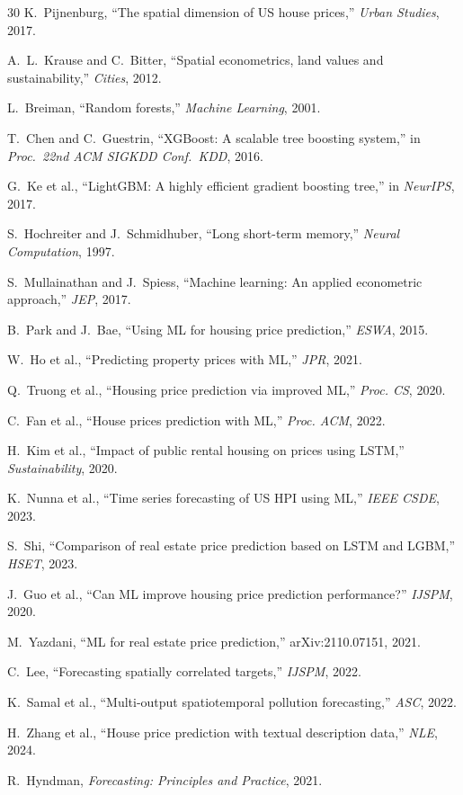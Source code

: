 \documentclass[runningheads]{llncs}
\begin{document}
\begin{thebibliography}{30}
K.~Pijnenburg,
``The spatial dimension of US house prices,''
\emph{Urban Studies}, 2017.

A.~L.~Krause and C.~Bitter,
``Spatial econometrics, land values and sustainability,''
\emph{Cities}, 2012.

L.~Breiman,
``Random forests,''
\emph{Machine Learning}, 2001.

T.~Chen and C.~Guestrin,
``XGBoost: A scalable tree boosting system,''
in \emph{Proc.\ 22nd ACM SIGKDD Conf.\ KDD}, 2016.

G.~Ke et al.,
``LightGBM: A highly efficient gradient boosting tree,''
in \emph{NeurIPS}, 2017.

S.~Hochreiter and J.~Schmidhuber,
``Long short-term memory,''
\emph{Neural Computation}, 1997.

S.~Mullainathan and J.~Spiess,
``Machine learning: An applied econometric approach,''
\emph{JEP}, 2017.

B.~Park and J.~Bae,
``Using ML for housing price prediction,''
\emph{ESWA}, 2015.

W.~Ho et al.,
``Predicting property prices with ML,''
\emph{JPR}, 2021.

Q.~Truong et al.,
``Housing price prediction via improved ML,''
\emph{Proc. CS}, 2020.

C.~Fan et al.,
``House prices prediction with ML,''
\emph{Proc. ACM}, 2022.

H.~Kim et al.,
``Impact of public rental housing on prices using LSTM,''
\emph{Sustainability}, 2020.

K.~Nunna et al.,
``Time series forecasting of US HPI using ML,''
\emph{IEEE CSDE}, 2023.

S.~Shi,
``Comparison of real estate price prediction based on LSTM and LGBM,''
\emph{HSET}, 2023.

J.~Guo et al.,
``Can ML improve housing price prediction performance?''
\emph{IJSPM}, 2020.

M.~Yazdani,
``ML for real estate price prediction,''
arXiv:2110.07151, 2021.

C.~Lee,
``Forecasting spatially correlated targets,''
\emph{IJSPM}, 2022.

K.~Samal et al.,
``Multi-output spatiotemporal pollution forecasting,''
\emph{ASC}, 2022.

H.~Zhang et al.,
``House price prediction with textual description data,''
\emph{NLE}, 2024.

R.~Hyndman,
\emph{Forecasting: Principles and Practice}, 2021.

\end{thebibliography}
\end{document}
